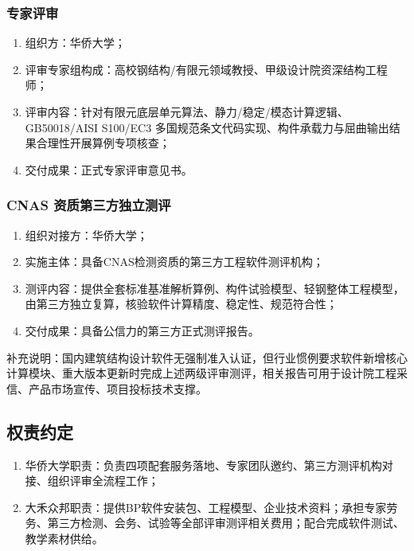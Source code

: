 \subsubsection{专家评审}
\begin{enumerate}[label=\arabic*., leftmargin=2em]
    \item 组织方：华侨大学；
    \item 评审专家组构成：高校钢结构/有限元领域教授、甲级设计院资深结构工程师；
    \item 评审内容：针对有限元底层单元算法、静力/稳定/模态计算逻辑、GB50018/AISI S100/EC3 多国规范条文代码实现、构件承载力与屈曲输出结果合理性开展算例专项核查；
    \item 交付成果：正式专家评审意见书。
\end{enumerate}

\subsubsection{CNAS 资质第三方独立测评}
\begin{enumerate}[label=\arabic*., leftmargin=2em]
    \item 组织对接方：华侨大学；
    \item 实施主体：具备CNAS检测资质的第三方工程软件测评机构；
    \item 测评内容：提供全套标准基准解析算例、构件试验模型、轻钢整体工程模型，由第三方独立复算，核验软件计算精度、稳定性、规范符合性；
    \item 交付成果：具备公信力的第三方正式测评报告。
\end{enumerate}

补充说明：国内建筑结构设计软件无强制准入认证，但行业惯例要求软件新增核心计算模块、重大版本更新时完成上述两级评审测评，相关报告可用于设计院工程采信、产品市场宣传、项目投标技术支撑。

\subsection{权责约定}
\begin{enumerate}[label=\arabic*., leftmargin=2em]
    \item 华侨大学职责：负责四项配套服务落地、专家团队邀约、第三方测评机构对接、组织评审全流程工作；
    \item 大禾众邦职责：提供BP软件安装包、工程模型、企业技术资料；承担专家劳务、第三方检测、会务、试验等全部评审测评相关费用；配合完成软件测试、教学素材供给。
\end{enumerate}